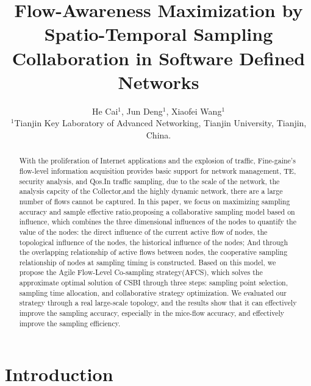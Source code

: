 \documentclass[conference]{IEEEtran}
\begin{document}
\title{Flow-Awareness Maximization by Spatio-Temporal Sampling Collaboration in Software Defined Networks}

\author{He Cai$^{1}$, Jun Deng$^{1}$, Xiaofei Wang$^{1}$
\\
${^1}$Tianjin Key Laboratory of Advanced Networking, %
Tianjin University, Tianjin, China.
}


\maketitle

\begin{abstract}
With the proliferation of Internet applications and the explosion of traffic, Fine-gaine's flow-level information acquisition provides basic support for network management, TE, security analysis, and Qos.In traffic sampling, due to the scale of the network, the analysis capcity of the Collector,and the highly dynamic network, there are a large number of flows cannot be captured. In this paper, we focus on maximizing sampling accuracy and sample effective ratio,proposing a collaborative sampling model based on influence, which combines the three dimensional influences of the nodes to quantify the value of the nodes: the direct influence of the current active flow of nodes, the topological influence of the nodes, the historical influence of the nodes; And through the overlapping relationship of active flows between nodes, the cooperative sampling relationship of nodes at sampling timing is constructed. Based on this model, we propose the Agile Flow-Level Co-sampling strategy(AFCS), which solves the approximate optimal solution of CSBI through three steps: sampling point selection, sampling time allocation, and collaborative strategy optimization. We evaluated our strategy through a real large-scale topology, and the results show that it can effectively improve the sampling accuracy, especially in the mice-flow accuracy, and effectively improve the sampling efficiency.
\end{abstract}
\IEEEpeerreviewmaketitle

\section{Introduction}
\end{document}
